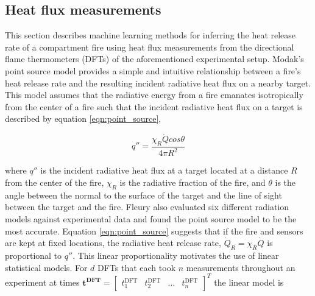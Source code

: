 \documentclass{article}
\begin{document}
\subsection{Heat flux measurements}
This section describes machine learning methods for inferring the heat release rate of a compartment fire using heat flux measurements from the directional flame thermometers (DFTs) of the aforementioned experimental setup. Modak's point source model \cite{modak1977thermal} provides a simple and intuitive relationship between a fire's heat release rate and the resulting incident radiative heat flux on a nearby target. This model assumes that the radiative energy from a fire emanates isotropically from the center of a fire such that the incident radiative heat flux on a target is described by equation \ref{eqn:point_source},

 \begin{equation}
  \label{eqn:point_source}
  q'' = \frac{\chi_R\dot{Q}cos\theta}{4\pi R^2}
\end{equation}

where $q''$ is the incident radiative heat flux at a target located at a distance $R$ from the center of the fire, $\chi_R$ is the radiative fraction of the fire, and $\theta$ is the angle between the normal to the surface of the target and the line of sight between the target and the fire. Fleury \cite{fleury2010evaluation} also evaluated six different radiation models against experimental data and found the point source model to be the most accurate. Equation \ref{eqn:point_source} suggests that if the fire and sensors are kept at fixed locations, the radiative heat release rate, $\dot{Q}_R = \chi_R\dot{Q}$ is proportional to $q''$.  This linear proportionality motivates the use of linear statistical models.  For $d$ DFTs that each took $n$ measurements throughout an experiment at times $\boldsymbol{t^{\text{DFT}}} = \begin{bmatrix}  t^{\text{DFT}}_1 & t^{\text{DFT}}_2 & \ldots & t^{\text{DFT}}_n \end{bmatrix}^T$ the linear model is 
\end{document}
